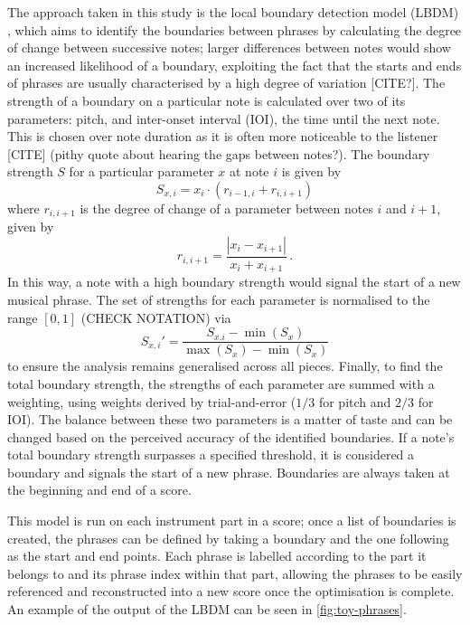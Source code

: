 \documentclass[12pt]{article}
\theoremstyle{definition}
\begin{document}
The approach taken in this study is the local boundary detection model (LBDM) \cite{cambouropoulos_lbdm_2011}, which aims to identify the boundaries between phrases by calculating the degree of change between successive notes; larger differences between notes would show an increased likelihood of a boundary, exploiting the fact that the starts and ends of phrases are usually characterised by a high degree of variation [CITE?]. The strength of a boundary on a particular note is calculated over two of its parameters: pitch, and inter-onset interval (IOI), the time until the next note. This is chosen over note duration as it is often more noticeable to the listener [CITE] (pithy quote about hearing the gaps between notes?). The boundary strength $S$ for a particular parameter $x$ at note $i$ is given by
\begin{equation}
    S_{x,i}=x_i\cdot (r_{i-1, i} + r_{i, i+1})
    \label{eq:boundary-strength}
\end{equation}
where $r_{i, i+1}$ is the degree of change of a parameter between notes $i$ and $i+1$, given by
\begin{equation}
    r_{i, i+1}=\frac{|x_{i}-x_{i+1}|}{x_{i}+x_{i+1}} \,.
    \label{eq:degree-change}
\end{equation}
In this way, a note with a high boundary strength would signal the start of a new musical phrase. The set of strengths for each parameter is normalised to the range $[0,1]$ (CHECK NOTATION) via
\begin{equation}
    S_{x,i}'=\frac{S_{x.i}-\min(S_x)}{\max(S_x)-\min(S_x)}
    \label{eq:normalisation}
\end{equation}
to ensure the analysis remains generalised across all pieces.
Finally, to find the total boundary strength, the strengths of each parameter are summed with a weighting, using weights derived by trial-and-error ($1/3$ for pitch and $2/3$ for IOI). The balance between these two parameters is a matter of taste and can be changed based on the perceived accuracy of the identified boundaries. If a note's total boundary strength surpasses a specified threshold, it is considered a boundary and signals the start of a new phrase. Boundaries are always taken at the beginning and end of a score.

This model is run on each instrument part in a score; once a list of boundaries is created, the phrases can be defined by taking a boundary and the one following as the start and end points. Each phrase is labelled according to the part it belongs to and its phrase index within that part, allowing the phrases to be easily referenced and reconstructed into a new score once the optimisation is complete. An example of the output of the LBDM can be seen in \cref{fig:toy-phrases}.
\end{document}
